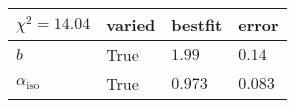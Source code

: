 \begin{tabular}{llll}
\hline
 $\chi^{2} = 14.04$      & varied   & bestfit   & error   \\
\hline
 $b$                     & True     & $1.99$    & $0.14$  \\
 $\alpha_{\mathrm{iso}}$ & True     & $0.973$   & $0.083$ \\
\hline
\end{tabular}